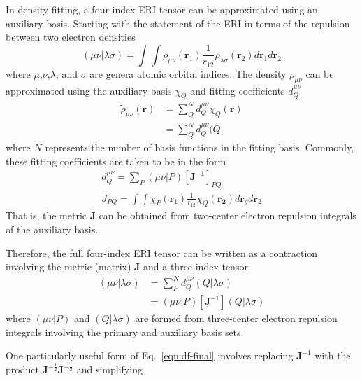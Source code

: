 \documentclass[12pt,letterpaper]{article}
\renewcommand{\vec}[1]{\ensuremath{\bm{#1}}\xspace}
\newcommand{\mat}[1]{\ensuremath{\bm{#1}}\xspace}
\begin{document}
In density fitting,\cite{Werner:2003a,Dunlap:1977a,Dunlap:1979a,Whitten:1973a} a four-index ERI tensor can be approximated
using an auxiliary basis. Starting with the statement of the ERI
in terms of the repulsion between two electron densities
%
\begin{equation}
(\mu \nu | \lambda \sigma) = \int \int \rho_{\mu \nu}(\vec{r}_1) \frac{1}{r_{12}} \rho_{\lambda \sigma}(\vec{r}_2) d\vec{r}_1 d\vec{r}_2
\end{equation}
%
where $\mu$,$\nu$,$\lambda$, and $\sigma$ are genera atomic orbital indices.
The density $\rho_{\mu\nu}$ can be approximated using the auxiliary basis $\chi_Q$
and fitting coefficients $d_Q^{\mu\nu}$
%
\begin{align}
\tilde{\rho}_{\mu\nu}(\vec{r}) &= \sum_Q^{N}d_Q^{\mu\nu} \chi_Q(\vec{r}) \\
                           &= \sum_Q^{N}d_Q^{\mu\nu} ( Q |
\end{align}
%
where $N$ represents the number of basis functions in the fitting basis.
Commonly, these fitting coefficients are taken to be in the form\cite{Dunlap:1977a,Dunlap:1979a}
%
\begin{gather}
d_Q^{\mu\nu} = \sum_P (\mu\nu | P)[\mat{J}^{-1}]_{PQ} \\
J_{PQ} = \int \int \chi_P(\vec{r}_1) \frac{1}{r_{12}} \chi_Q(\vec{r_2}) d\vec{r}_q d\vec{r}_2 \label{eqn:metric}
\end{gather}
%
That is, the metric $\mat{J}$ can be obtained from two-center electron repulsion integrals
of the auxiliary basis.

Therefore, the full four-index ERI tensor can be written as a contraction involving
the metric (matrix) $\mat{J}$ and a three-index tensor
%
\begin{align}
(\mu\nu|\lambda\sigma) &= \sum_P^{N}d_Q^{\mu\nu} (Q | \lambda\sigma) \\
        &= (\mu\nu | P) [\mat{J}^{-1}] (Q | \lambda\sigma) \label{eqn:df-final}
\end{align}
%
where $(\mu\nu | P)$ and $(Q | \lambda\sigma)$ are formed from three-center electron
repulsion integrals involving the primary and auxiliary basis sets.

One particularly useful form of Eq.~\ref{eqn:df-final}
involves replacing $\mat{J}^{-1}$ with the product
$\mat{J}^{-\frac{1}{2}}\mat{J}^{-\frac{1}{2}}$ and simplifying
\end{document}
